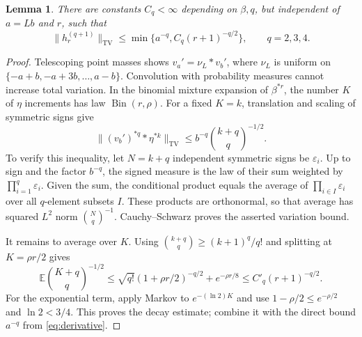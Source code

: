 \documentclass[11pt,a4paper]{article}
\newtheorem{lemma}[theorem]{Lemma}
\numberwithin{equation}{section}
\newcommand{\E}{\mathbb E}
\newcommand{\TV}{\mathrm{TV}}
\begin{document}
\begin{lemma}\label{lem:decay}
There are constants $C_q<\infty$ depending on $\beta,q$, but independent
of $a=Lb$ and $r$, such that
\begin{equation}\label{eq:decay}
\|h_r^{(q+1)}\|_{\TV}
\le\min\{a^{-q},C_q(r+1)^{-q/2}\},\qquad q=2,3,4.
\end{equation}
\end{lemma}
\begin{proof}
Telescoping point masses shows
$v_a'=\nu_L*v_b'$, where $\nu_L$ is uniform on
$\{-a+b,-a+3b,\ldots,a-b\}$.
Convolution with probability measures cannot increase total variation.
In the binomial mixture expansion of $\beta^{*r}$, the number $K$ of
$\eta$ increments has law $\operatorname{Bin}(r,\rho)$.
For a fixed $K=k$, translation and scaling of symmetric signs give
\[
\|(v_b')^{*q}*\eta^{*k}\|_{\TV}
\le b^{-q}\binom{k+q}{q}^{-1/2}.
\]
To verify this inequality, let $N=k+q$ independent symmetric signs be
$\varepsilon_i$. Up to sign and the factor $b^{-q}$, the signed measure
is the law of their sum weighted by $\prod_{i=1}^q\varepsilon_i$.
Given the sum, the conditional product equals the average of
$\prod_{i\in I}\varepsilon_i$ over all $q$-element subsets $I$.
These products are orthonormal, so that average has squared $L^2$ norm
$\binom Nq^{-1}$. Cauchy--Schwarz proves the asserted variation bound.

It remains to average over $K$. Using
$\binom{k+q}{q}\ge(k+1)^q/q!$ and splitting at $K=\rho r/2$ gives
\[
\E\binom{K+q}{q}^{-1/2}
\le\sqrt{q!}(1+\rho r/2)^{-q/2}+e^{-\rho r/8}
\le C'_q(r+1)^{-q/2}.
\]
For the exponential term, apply Markov to $e^{-(\ln2)K}$ and use
$1-\rho/2\le e^{-\rho/2}$ and $\ln2<3/4$.
This proves the decay estimate; combine it with the direct bound
$a^{-q}$ from \eqref{eq:derivative}.
\end{proof}
\end{document}
